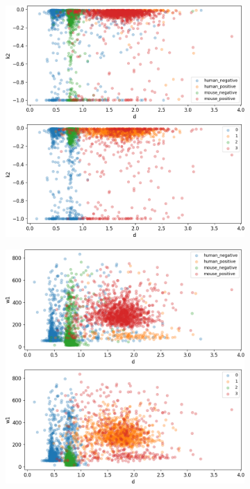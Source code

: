 \begin{figure}
\begin{subfigure}{0.49\textwidth}
	\end{subfigure}
	\hfill
	\begin{subfigure}{0.49\textwidth}
		\includegraphics[width=\textwidth]{fig/seperate_d_k2}
	\end{subfigure}
	\hfill
	\begin{subfigure}{0.49\textwidth}
		\includegraphics[width=\textwidth]{fig/seperate_d_w1}

\end{subfigure}
\end{figure}
